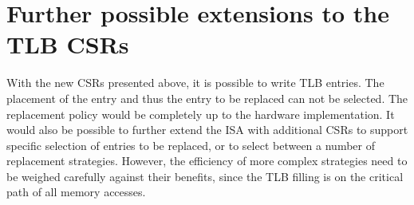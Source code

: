 \section{Further possible extensions to the TLB CSRs}
With the new CSRs presented above, it is possible to write TLB entries.
The placement of the entry and thus the entry to be replaced can not be selected.
The replacement policy would be completely up to the hardware implementation.
It would also be possible to further extend the ISA with additional CSRs to
support specific selection of entries to be replaced, or to select between
a number of replacement strategies.
However, the efficiency of more complex strategies need to be weighed carefully
against their benefits, since the TLB filling is on the critical path of all
memory accesses.












